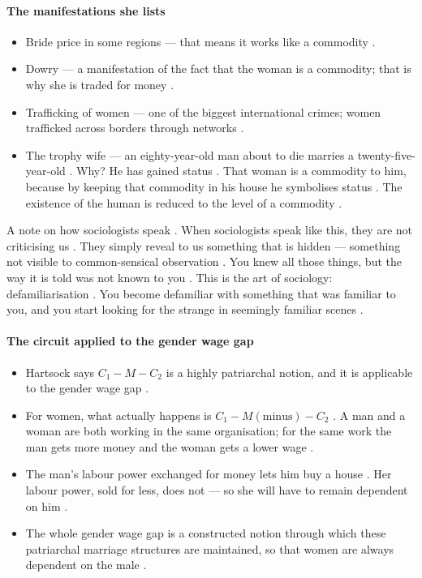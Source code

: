 \paragraph{The manifestations she lists}
\begin{itemize}
    \item Bride price in some regions --- that means it works like a commodity .
    \item Dowry --- a manifestation of the fact that the woman is a commodity; that is why she is traded for money .
    \item Trafficking of women --- one of the biggest international crimes; women trafficked across borders through networks .
    \item The trophy wife --- an eighty-year-old man about to die marries a twenty-five-year-old . Why? He has gained status . That woman is a commodity to him, because by keeping that commodity in his house he symbolises status . The existence of the human is reduced to the level of a commodity .
\end{itemize}

\begin{KeyConcept}
A note on how sociologists speak . When sociologists speak like this, they are not criticising us . They simply reveal to us something that is hidden --- something not visible to common-sensical observation . You knew all those things, but the way it is told was not known to you . This is the art of sociology: defamiliarisation . You become defamiliar with something that was familiar to you, and you start looking for the strange in seemingly familiar scenes .
\end{KeyConcept}

\paragraph{The circuit applied to the gender wage gap}
\begin{itemize}
    \item Hartsock says $C_1 - M - C_2$ is a highly patriarchal notion, and it is applicable to the gender wage gap .
    \item For women, what actually happens is $C_1 - M(\text{minus}) - C_2$ . A man and a woman are both working in the same organisation; for the same work the man gets more money and the woman gets a lower wage .
    \item The man's labour power exchanged for money lets him buy a house . Her labour power, sold for less, does not --- so she will have to remain dependent on him .
    \item The whole gender wage gap is a constructed notion through which these patriarchal marriage structures are maintained, so that women are always dependent on the male .
\end{itemize}

